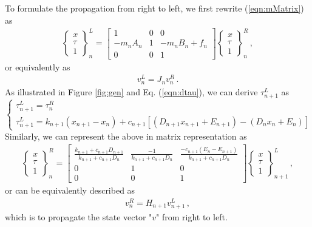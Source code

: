 \documentclass[11pt]{ucthesis}
\begin{document}
To formulate the propagation from right to left, we first rewrite (\ref{eqn:mMatrix}) as
\begin{eqnarray}
\left\{\begin{matrix}x\\\tau\\1\end{matrix}\right\}^L_n =
\begin{bmatrix}1&0&0\\-m_nA_n&1&-m_nB_n+f_n\\0&0&1\end{bmatrix}\left\{\begin{matrix}x\\\tau\\1\end{matrix}\right\}^R_n \,,
\end{eqnarray}
or equivalently as
\begin{eqnarray}
v_n^L = J_n v_n^R \,.
\label{eqn:simpJ}
\end{eqnarray}
As illustrated in Figure \ref{fig:gen} and Eq. (\ref{eqn:dtau}), we can derive $\tau_{n+1}^{L}$ as
\[
\left \{
\begin{array}{l}
\tau_{n+1}^{L} = \tau_{n}^{R} \\
\tau_{n+1}^L = k_{n+1} (x_{n+1}-x_{n} ) +c_{n+1} \left[(D_{n+1} x_{n+1} + E_{n+1})-(D_{n}x_{n}+E_{n} )\right]
\end{array} 
\right .
\]
Similarly, we can represent the above in matrix representation as
\begin{eqnarray}
\left\{\begin{matrix}x\\\tau\\1\end{matrix}\right\}^R_n = 
\begin{bmatrix}\frac{k_{n+1}+c_{n+1} D_{n+1}}{k_{n+1}+c_{n+1} D_{n}}&\frac{-1}{k_{n+1}+c_{n+1} D_{n}}&\frac{-c_{n+1}(E_{n}-E_{n+1})}{k_{n+1}+c_{n+1} D_{n}}\\0&1&0\\0&0&1\end{bmatrix}\left\{\begin{matrix}x\\\tau\\1\end{matrix}\right\}^L_{n+1} \,,
\end{eqnarray}
or can be equivalently described as 
\begin{eqnarray}
v_n^R = H_{n+1} v_{n+1}^L \,,
\label{eqn:simpH}
\end{eqnarray}
which is to propagate the state vector "$v$" from right to left.
\end{document}

